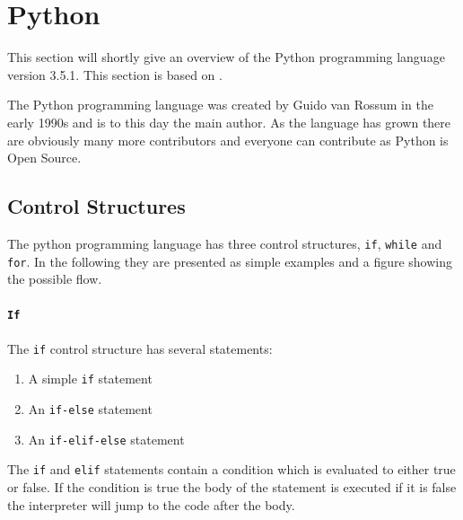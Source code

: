 \section{Python}\label{python}
This section will shortly give an overview of the Python programming language version 3.5.1.
This section is based on \citet{python_docs}.

The Python programming language was created by Guido van Rossum in the early 1990s and is to this day the main author.
As the language has grown there are obviously many more contributors and everyone can contribute as Python is Open Source.

\subsection{Control Structures}\label{python:control_structures}
The python programming language has three control structures, \texttt{if}, \texttt{while} and \texttt{for}.
In the following they are presented as simple examples and a figure showing the possible flow.

\paragraph{\texttt{If}}
The \texttt{if} control structure has several statements:
\begin{enumerate}
\item A simple \texttt{if} statement
\item An \texttt{if-else} statement
\item An \texttt{if-elif-else} statement
\end{enumerate}
The \texttt{if} and \texttt{elif} statements contain a condition which is evaluated to either true or false.
If the condition is true the body of the statement is executed if it is false the interpreter will jump to the code after the body.

